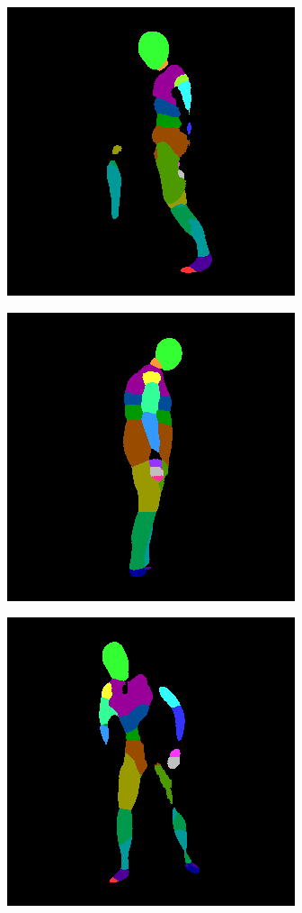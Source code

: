 \documentclass{beamer}
\begin{document}
\begin{frame}
\begin{figure}
\end{figure}
\begin{figure}
\begin{subfigure}{.3\textwidth}
\centering
  \includegraphics[scale=0.21]{36_04_c0001_segm_30_seg.png}
\end{subfigure}%
\begin{subfigure}{.3\textwidth}
  \centering
  \includegraphics[scale=0.21]{36_16_c0002_segm_34_seg.png}
\end{subfigure}
\begin{subfigure}{.3\textwidth}
  \centering
  \includegraphics[scale=0.21]{104_52_c0002_segm_38_seg.png}
\end{subfigure}

\label{segnet:inference}
\end{figure}


\end{frame}
\end{document}
